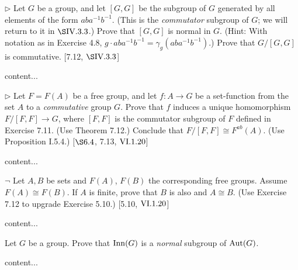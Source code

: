 \begin{exercise}
	$\triangleright$ Let $G$ be a group, and let $[G,G]$ be the subgroup of $G$ generated by all elements of the form $aba^{-1}b^{-1}$. (This is the \emph{commutator} subgroup of $G$; we will return to it in $\S \RNo{4}.3.3$.) Prove that $[G,G]$ is normal in $G$. (Hint: With notation as in Exercise 4.8, $g\cdot aba^{-1}b^{-1} = \gamma_g(aba^{-1}b^{-1})$.) Prove that $G/[G,G]$ is commutative. [7.12, $\S\RNo{4}.3.3$]
\end{exercise}
\begin{solution}
	content...
\end{solution}

\begin{exercise}
	$\triangleright$ Let $F = F(A)$ be a free group, and let $f\colon A \to G$ be a set-function from the set $A$ to a \emph{commutative} group $G$. Prove that $f$ induces a unique homomorphism $F/[F,F]\to G$, where $[F,F]$ is the commutator subgroup of $F$ defined in Exercise 7.11. (Use Theorem 7.12.) Conclude that $F/[F,F]\cong F^{ab}(A)$. (Use Proposition I.5.4.) [$\S 6.4$, 7.13, $\RNo{6}.1.20$]
\end{exercise}
\begin{solution}
	content...
\end{solution}

\begin{exercise}
	$\neg$ Let $A,B$ be sets and $F(A)$, $F(B)$ the corresponding free groups. Assume $F(A) \cong F(B)$. If $A$ is finite, prove that $B$ is also and $A\cong B$. (Use Exercise 7.12 to upgrade Exercise 5.10.) [5.10, $\RNo{6}.1.20$]
\end{exercise}
\begin{solution}
	content...
\end{solution}

\begin{exercise}
	Let $G$ be a group. Prove that $\operatorname{Inn}(G)$ is a \emph{normal} subgroup of $\operatorname{Aut}(G)$.
\end{exercise}
\begin{solution}
	content...
\end{solution}